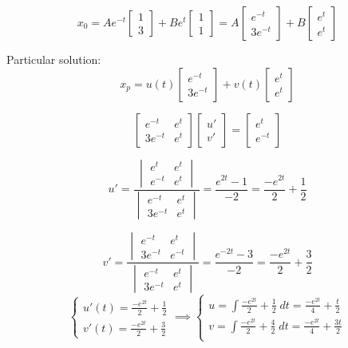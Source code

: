 \documentclass[12pt]{article}
\begin{document}
\[x_0 = Ae^{-t}\begin{bmatrix}
    1\\3
\end{bmatrix} + Be^t \begin{bmatrix}
    1\\1
\end{bmatrix} = A\begin{bmatrix}
    e^{-t}\\
    3e^{-t}
\end{bmatrix} + B \begin{bmatrix}
    e^t\\
    e^t
\end{bmatrix}\]

Particular solution:
\[x_p = u(t)\begin{bmatrix}
    e^{-t}\\
    3e^{-t}
\end{bmatrix} + v(t) \begin{bmatrix}
    e^t\\
    e^t
\end{bmatrix}\]

\[\begin{bmatrix}
    e^{-t} & e^t\\
    3e^{-t} & e^t
\end{bmatrix} \begin{bmatrix}
    u'\\
    v'
\end{bmatrix} = \begin{bmatrix}
    e^t\\
    e^{-t}
\end{bmatrix}\]

\[u' = \frac{\begin{vmatrix}
    e^{t} & e^t\\
    e^{-t} & e^t
\end{vmatrix}}{\begin{vmatrix}
    e^{-t} & e^t\\
    3e^{-t} & e^t
\end{vmatrix}} = \frac{e^{2t} - 1}{-2} = \frac{-e^{2t}}{2} + \frac{1}{2}\]

\[v' = \frac{\begin{vmatrix}
    e^{-t} & e^t\\
    3e^{-t} & e^{-t}
\end{vmatrix}}{\begin{vmatrix}
    e^{-t} & e^t\\
    3e^{-t} & e^t
\end{vmatrix}} = \frac{e^{-2t} - 3}{-2} = \frac{-e^{2t}}{2} + \frac{3}{2}\]
\[\begin{cases}
    u'(t) = \frac{-e^{2t}}{2} + \frac{1}{2}\\
    v'(t) = \frac{-e^{2t}}{2} + \frac{3}{2}
\end{cases} \implies \begin{cases}
    u = \int \frac{-e^{2t}}{2} + \frac{1}{2}\; dt = \frac{-e^{2t}}{4} + \frac{t}{2}\\
    v= \int \frac{-e^{2t}}{2} + \frac{4}{2}\; dt = \frac{-e^{2t}}{4} + \frac{3t}{2}\\
\end{cases}\]
\end{document}
